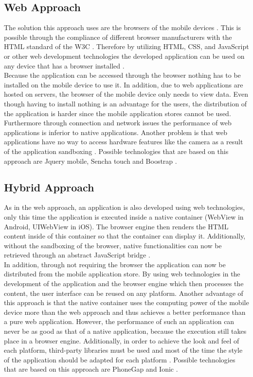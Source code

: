 \documentclass[Bachelor,BIF,english]{twbook}
\begin{document}
\subsection{Web Approach}
The solution this approach uses are the browsers of the mobile devices \cite[p.~2]{7934674}. This is possible through the compliance of different browser manufacturers with the HTML standard of the W3C \cite[p.~2]{LinckArne2016}. Therefore by utilizing HTML, CSS, and JavaScript or other web development technologies the developed application can be used on any device that has a browser installed \cite[p.~2]{7934674}.
\\[\baselineskip]
Because the application can be accessed through the browser nothing has to be installed on the mobile device to use it. In addition, due to web applications are hosted on servers, the browser of the mobile device only needs to view data. Even though having to install nothing is an advantage for the users, the distribution of the application is harder since the mobile application stores cannot be used. Furthermore through connection and network issues the performance of web applications is inferior to native applications. Another problem is that web applications have no way to access hardware features like the camera as a result of the application sandboxing \cite[p.~626]{6420693}. Possible technologies that are based on this approach are Jquery mobile, Sencha touch and Boostrap \cite[p.~2]{7934674}.

\subsection{Hybrid Approach}
As in the web approach, an application is also developed using web technologies, only this time the application is executed inside a native container (WebView in Android, UIWebView in iOS). The browser engine then renders the HTML content inside of this container so that the container can display it. Additionally, without the sandboxing of the browser, native functionalities can now be retrieved through an abstract JavaScript bridge \cite[p.~626]{6420693} \cite[p.~2]{7479278}. 
\\[\baselineskip]
In addition, through not requiring the browser the application can now be distributed from the mobile application store. By using web technologies in the development of the application and the browser engine which then processes the content, the user interface can be reused on any platform. Another advantage of this approach is that the native container uses the computing power of the mobile device more than the web approach and thus achieves a better performance than a pure web application. However, the performance of such an application can never be as good as that of a native application, because the execution still takes place in a browser engine. Additionally, in order to achieve the look and feel of each platform, third-party libraries must be used and most of the time the style of the application should be adapted for each platform \cite[p.~626]{6420693}. Possible technologies that are based on this approach are PhoneGap and Ionic \cite[p.~2]{7934674}.
\end{document}
